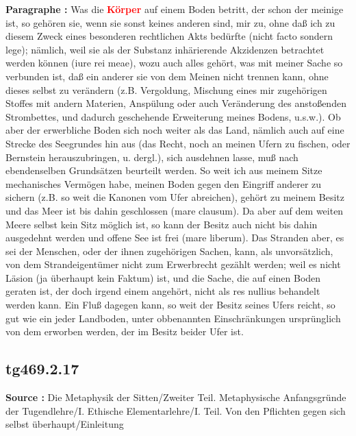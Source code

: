 \documentclass[a4paper,12pt,twoside]{book}
\newcommand{\match}[1]{\textcolor{red}{\textbf{#1}}}
\begin{document}
	\textbf{Paragraphe : }Was die \match{Körper} auf einem Boden betritt, der schon der meinige ist, so gehören sie, wenn sie sonst keines anderen sind, mir zu, ohne daß ich zu diesem Zweck eines besonderen rechtlichen Akts bedürfte (nicht facto sondern lege); nämlich, weil sie als der Substanz inhärierende Akzidenzen betrachtet werden können (iure rei  meae), wozu auch alles gehört, was mit meiner Sache so verbunden ist, daß ein anderer sie von dem Meinen nicht trennen kann, ohne dieses selbst zu verändern (z.B. Vergoldung, Mischung eines mir zugehörigen Stoffes mit andern Materien, Anspülung oder auch Veränderung des anstoßenden Strombettes, und dadurch geschehende Erweiterung meines Bodens, u.s.w.). Ob aber der erwerbliche Boden sich noch weiter als das Land, nämlich auch auf eine Strecke des Seegrundes hin aus (das Recht, noch an meinen Ufern zu fischen, oder Bernstein herauszubringen, u. dergl.), sich ausdehnen lasse, muß nach ebendenselben Grundsätzen beurteilt werden. So weit ich aus meinem Sitze mechanisches Vermögen habe, meinen Boden gegen den Eingriff anderer zu sichern (z.B. so weit die Kanonen vom Ufer abreichen), gehört zu meinem Besitz und das Meer ist bis dahin geschlossen (mare clausum). Da aber auf dem weiten Meere selbst kein Sitz möglich ist, so kann der Besitz auch nicht bis dahin ausgedehnt werden und offene See ist frei (mare liberum). Das Stranden aber, es sei der Menschen, oder der ihnen zugehörigen Sachen, kann, als unvorsätzlich, von dem Strandeigentümer nicht zum Erwerbrecht gezählt werden; weil es nicht Läsion (ja überhaupt kein Faktum) ist, und die Sache, die auf einen Boden geraten ist, der doch irgend einem angehört, nicht als res nullius behandelt werden kann. Ein Fluß dagegen kann, so weit der Besitz seines Ufers reicht, so gut wie ein jeder Landboden, unter obbenannten Einschränkungen ursprünglich von dem erworben werden, der im Besitz beider Ufer ist. 
	
	\subsection*{tg469.2.17} 
	\textbf{Source : }Die Metaphysik der Sitten/Zweiter Teil. Metaphysische Anfangsgründe der Tugendlehre/I. Ethische Elementarlehre/I. Teil. Von den Pflichten gegen sich selbst überhaupt/Einleitung\\  
	
\end{document}
